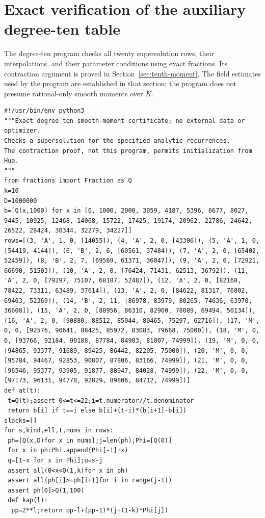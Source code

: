 \documentclass[11pt,reqno]{amsart}
\numberwithin{equation}{section}
\theoremstyle{definition}
\begin{document}
\section{Exact verification of the auxiliary degree-ten table}
\label{app:decic}
The degree-ten program checks all twenty supersolution rows, their
interpolations, and their parameter conditions using exact fractions.
Its contraction argument is proved in Section~\ref{sec:tenth-moment}.
The field estimates used by the program are established in that section;
the program does not presume rational-only smooth moments over $K$.

\begin{lstlisting}
#!/usr/bin/env python3
"""Exact degree-ten smooth-moment certificate; no external data or optimizer.
Checks a supersolution for the specified analytic recurrences.
The contraction proof, not this program, permits initialization from Hua.
"""
from fractions import Fraction as Q
k=10
D=1000000
b=[Q(x,1000) for x in [0, 1000, 2000, 3059, 4187, 5396, 6677, 8027, 9445, 10925, 12468, 14068, 15722, 17425, 19174, 20962, 22786, 24642, 26522, 28424, 30344, 32279, 34227]]
rows=[(3, 'A', 1, 0, [14055]), (4, 'A', 2, 0, [43306]), (5, 'A', 1, 0, [54419, 4144]), (6, 'B', 2, 6, [60561, 37484]), (7, 'A', 2, 0, [65402, 52459]), (8, 'B', 2, 7, [69569, 61371, 36047]), (9, 'A', 2, 0, [72921, 66690, 51503]), (10, 'A', 2, 0, [76424, 71431, 62513, 36792]), (11, 'A', 2, 0, [79297, 75107, 68187, 52487]), (12, 'A', 2, 0, [82168, 78422, 73311, 63489, 37614]), (13, 'A', 2, 0, [84622, 81317, 76802, 69403, 52369]), (14, 'B', 2, 11, [86978, 83979, 80265, 74636, 63970, 36608]), (15, 'A', 2, 0, [88956, 86310, 82900, 78089, 69494, 50134]), (16, 'A', 2, 0, [90880, 88512, 85044, 80465, 75297, 62716]), (17, 'M', 0, 0, [92576, 90641, 88425, 85972, 83083, 79668, 75000]), (18, 'M', 0, 0, [93766, 92184, 90188, 87784, 84903, 81007, 74999]), (19, 'M', 0, 0, [94865, 93377, 91689, 89425, 86442, 82205, 75000]), (20, 'M', 0, 0, [95784, 94467, 92853, 90807, 87806, 83166, 74999]), (21, 'M', 0, 0, [96546, 95377, 93905, 91877, 88947, 84028, 74999]), (22, 'M', 0, 0, [97173, 96131, 94778, 92829, 89806, 84712, 74999])]
def at(t):
 t=Q(t);assert 0<=t<=22;i=t.numerator//t.denominator
 return b[i] if t==i else b[i]+(t-i)*(b[i+1]-b[i])
slacks=[]
for s,kind,ell,t,nums in rows:
 ph=[Q(x,D)for x in nums];j=len(ph);Phi=[Q(0)]
 for x in ph:Phi.append(Phi[-1]+x)
 q=[1-x for x in Phi];u=s-j
 assert all(0<x<Q(1,k)for x in ph)
 assert all(ph[i]>=ph[i+1]for i in range(j-1))
 assert ph[0]>Q(1,100)
 def kap(l):
  pp=2**l;return pp-l+(pp-1)*(j+(1-k)*Phi[j])

\end{lstlisting}
\end{document}
